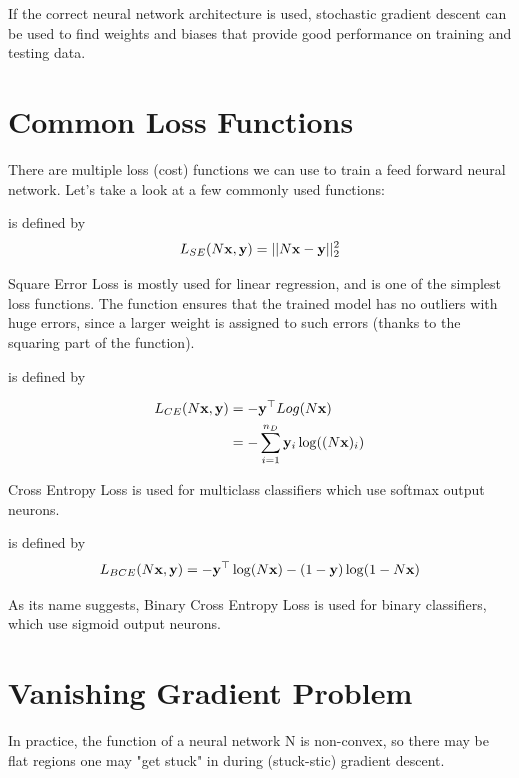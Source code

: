 If the correct neural network architecture is used, stochastic gradient descent can be used to find weights and biases that provide good performance on training and testing data.

\section{Common Loss Functions}

There are multiple loss (cost) functions we can use to train a feed forward neural network. Let's take a look at a few commonly used functions:

\smallskip
\begin{definition}
     is defined by
    $$
    L_{SE}(N\vx,\vy) = ||N\vx-\vy||_{2}^{2}
    $$
\end{definition}
Square Error Loss is mostly used for linear regression, and is one of the simplest loss functions. The function ensures that the trained model has no outliers with huge errors, since a larger weight is assigned to such errors (thanks to the squaring part of the function).

\medskip
\begin{definition}
     is defined by
    \begin{ceqn}
    \begin{align*}
        L_{CE}(N\vx,\vy) &= -\vy^\top Log(N\vx) \\
        &= -\sum_{i=1}^{n_D}{\vy_i\log((N\vx)_i)}
    \end{align*}
    \end{ceqn}
\end{definition}
Cross Entropy Loss is used for multiclass classifiers which use softmax output neurons.

\medskip
\begin{definition}
     is defined by
    $$
    L_{BCE}(N\vx,\vy) = -\vy^\top\log(N\vx) - (1-\vy)\log(1-N\vx)
    $$
\end{definition}
As its name suggests, Binary Cross Entropy Loss is used for binary classifiers, which use sigmoid output neurons.


\section{Vanishing Gradient Problem}
In practice, the function of a neural network N is non-convex, so there may be flat regions one may "get stuck" in during (stuck-stic) gradient descent.

